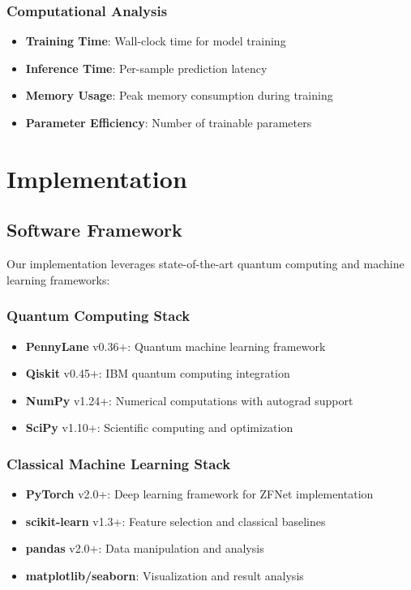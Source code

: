 \documentclass[conference]{IEEEtran}
\begin{document}
\subsubsection{Computational Analysis}
\begin{itemize}
    \item \textbf{Training Time}: Wall-clock time for model training
    \item \textbf{Inference Time}: Per-sample prediction latency
    \item \textbf{Memory Usage}: Peak memory consumption during training
    \item \textbf{Parameter Efficiency}: Number of trainable parameters
\end{itemize}

\section{Implementation}
\label{sec:implementation}

\subsection{Software Framework}

Our implementation leverages state-of-the-art quantum computing and machine learning frameworks:

\subsubsection{Quantum Computing Stack}
\begin{itemize}
    \item \textbf{PennyLane} v0.36+: Quantum machine learning framework
    \item \textbf{Qiskit} v0.45+: IBM quantum computing integration
    \item \textbf{NumPy} v1.24+: Numerical computations with autograd support
    \item \textbf{SciPy} v1.10+: Scientific computing and optimization
\end{itemize}

\subsubsection{Classical Machine Learning Stack}
\begin{itemize}
    \item \textbf{PyTorch} v2.0+: Deep learning framework for ZFNet implementation
    \item \textbf{scikit-learn} v1.3+: Feature selection and classical baselines
    \item \textbf{pandas} v2.0+: Data manipulation and analysis
    \item \textbf{matplotlib/seaborn}: Visualization and result analysis
\end{itemize}
\end{document}
